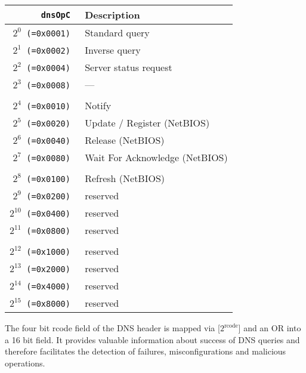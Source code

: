 \documentclass[documentation]{subfiles}
\begin{document}
\begin{longtable}{>{\tt}rl}
    \toprule
    {\bf dnsOpC}       & {\bf Description}\\
    \midrule\endhead%
    $2^{0}$  (=0x0001) & Standard query \\
    $2^{1}$  (=0x0002) & Inverse query \\
    $2^{2}$  (=0x0004) & Server status request \\
    $2^{3}$  (=0x0008) & --- \\
    \\
    $2^{4}$  (=0x0010) & Notify \\
    $2^{5}$  (=0x0020) & Update / Register (NetBIOS) \\
    $2^{6}$  (=0x0040) & Release (NetBIOS) \\
    $2^{7}$  (=0x0080) & Wait For Acknowledge (NetBIOS) \\
    \\
    $2^{8}$  (=0x0100) & Refresh (NetBIOS) \\
    $2^{9}$  (=0x0200) & reserved \\
    $2^{10}$ (=0x0400) & reserved \\
    $2^{11}$ (=0x0800) & reserved \\
    \\
    $2^{12}$ (=0x1000) & reserved \\
    $2^{13}$ (=0x2000) & reserved \\
    $2^{14}$ (=0x4000) & reserved \\
    $2^{15}$ (=0x8000) & reserved \\
    \bottomrule
\end{longtable}

The four bit rcode field of the DNS header is mapped via [$2^{\text{rcode}}$] and an OR
into a 16 bit field. It provides valuable information about success of DNS queries
and therefore facilitates the detection of failures, misconfigurations and malicious
operations.
\end{document}
